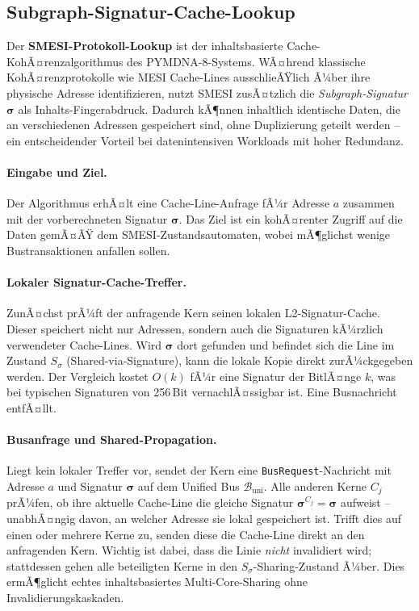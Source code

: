 ﻿\documentclass[a4paper,12pt]{article}
\theoremstyle{definition}
\begin{document}
\subsection{Subgraph-Signatur-Cache-Lookup}

Der \textbf{SMESI-Protokoll-Lookup} ist der inhaltsbasierte Cache-KohÃ¤renzalgorithmus des PYMDNA-8-Systems. WÃ¤hrend klassische KohÃ¤renzprotokolle wie MESI Cache-Lines ausschlieÃŸlich Ã¼ber ihre physische Adresse identifizieren, nutzt SMESI zusÃ¤tzlich die \emph{Subgraph-Signatur} $\boldsymbol{\sigma}$ als Inhalts-Fingerabdruck. Dadurch kÃ¶nnen inhaltlich identische Daten, die an verschiedenen Adressen gespeichert sind, ohne Duplizierung geteilt werden -- ein entscheidender Vorteil bei datenintensiven Workloads mit hoher Redundanz.

\paragraph{Eingabe und Ziel.}
Der Algorithmus erhÃ¤lt eine Cache-Line-Anfrage fÃ¼r Adresse $a$ zusammen mit der vorberechneten Signatur $\boldsymbol{\sigma}$. Das Ziel ist ein kohÃ¤renter Zugriff auf die Daten gemÃ¤ÃŸ dem SMESI-Zustandsautomaten, wobei mÃ¶glichst wenige Bustransaktionen anfallen sollen.

\paragraph{Lokaler Signatur-Cache-Treffer.}
ZunÃ¤chst prÃ¼ft der anfragende Kern seinen lokalen L2-Signatur-Cache. Dieser speichert nicht nur Adressen, sondern auch die Signaturen kÃ¼rzlich verwendeter Cache-Lines. Wird $\boldsymbol{\sigma}$ dort gefunden und befindet sich die Line im Zustand $S_\sigma$ (Shared-via-Signature), kann die lokale Kopie direkt zurÃ¼ckgegeben werden. Der Vergleich kostet $O(k)$ fÃ¼r eine Signatur der BitlÃ¤nge $k$, was bei typischen Signaturen von 256\,Bit vernachlÃ¤ssigbar ist. Eine Busnachricht entfÃ¤llt.

\paragraph{Busanfrage und Shared-Propagation.}
Liegt kein lokaler Treffer vor, sendet der Kern eine \texttt{BusRequest}-Nachricht mit Adresse $a$ und Signatur $\boldsymbol{\sigma}$ auf dem Unified Bus $\mathcal{B}_{\mathrm{uni}}$. Alle anderen Kerne $C_j$ prÃ¼fen, ob ihre aktuelle Cache-Line die gleiche Signatur $\boldsymbol{\sigma}^{C_j} = \boldsymbol{\sigma}$ aufweist -- unabhÃ¤ngig davon, an welcher Adresse sie lokal gespeichert ist. Trifft dies auf einen oder mehrere Kerne zu, senden diese die Cache-Line direkt an den anfragenden Kern. Wichtig ist dabei, dass die Linie \emph{nicht} invalidiert wird; stattdessen gehen alle beteiligten Kerne in den $S_\sigma$-Sharing-Zustand Ã¼ber. Dies ermÃ¶glicht echtes inhaltsbasiertes Multi-Core-Sharing ohne Invalidierungskaskaden.
\end{document}
